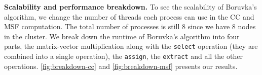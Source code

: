 \documentclass{sokendai_thesis} %
\newcommand{\boruvka}[0]{Boruvka}
\begin{document}

\textbf{Scalability and performance breakdown.}
To see the scalability of \boruvka{}'s algorithm, we change the number of threads each process can use in the CC and MSF computation.
The total number of processes is still 8 since we have 8 nodes in the cluster.
We break down the runtime of \boruvka{}'s algorithm into four parts, the matrix-vector multiplication along with the \texttt{select} operation (they are combined into a single operation), the \texttt{assign}, the \texttt{extract} and all the other operations.
\autoref{fig:breakdown-cc} and \autoref{fig:breakdown-msf} presents our results.
\end{document}
